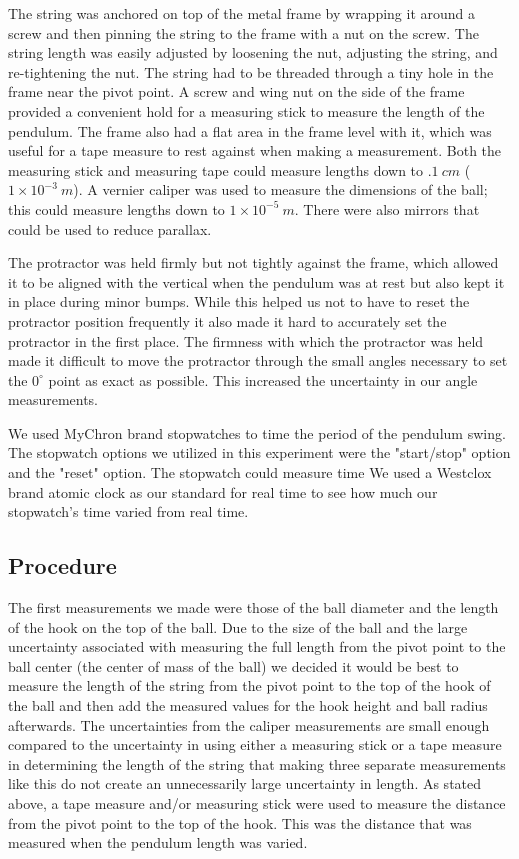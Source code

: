 \documentclass[iop]{emulateapj}
\def\deg{^{\circ}}
\begin{document}
The string was anchored 
on top of the metal frame by wrapping it around a screw and then pinning the 
string to the frame with a nut on the screw.  The string length was easily 
adjusted by loosening the nut, adjusting the string, and re-tightening the 
nut.  The string had to be threaded through a tiny hole in the frame near 
the pivot point. 
A screw and wing nut on the side of the frame provided a convenient hold 
for a measuring stick to measure the length of the pendulum.  The frame also 
had a flat area in the frame level with it, which was useful for a tape 
measure to rest against when making a measurement.  Both the measuring stick 
and measuring tape could measure lengths down to $.1~cm$ 
($1\times 10^{-3}~m$).  A vernier caliper was used to measure the dimensions 
of the ball; this could measure lengths down to $1\times 10^{-5}~m$. There 
were also mirrors that could be used to reduce parallax.



The protractor was held firmly but not tightly against the frame, which 
allowed it to be aligned with the vertical when the pendulum was at rest 
but also 
kept it in place during minor bumps.  While this helped us not to have to 
reset the protractor position frequently it also made it hard to accurately 
set the protractor in the first place. The firmness with which the protractor 
was held made it difficult to move the protractor through the small angles 
necessary to set the $0\deg$ point as exact as possible.  This increased the 
uncertainty in our angle measurements.

We used MyChron brand stopwatches to time the period of the pendulum 
swing.  The stopwatch options we utilized in this experiment were the 
"start/stop" option and the "reset" option. The stopwatch could measure time 
We used a Westclox brand atomic clock as our standard for real time 
to see how much our stopwatch's time varied from real time.

\subsection{Procedure}

The first measurements we made were those of the ball diameter and the length 
of the hook on the top of the ball.  Due to the size of 
the ball and the large uncertainty associated with measuring the full length 
from the pivot point to the ball center (the center of mass of the
ball) we decided it would be best to measure the length of the string from the
pivot point to the top of the hook of the ball and then add the measured values 
for the hook height and ball radius afterwards.  The uncertainties from the 
caliper measurements are small enough compared to the uncertainty in using 
either a measuring stick or a tape measure in determining the length of the
string that making three separate measurements like this do not create an 
unnecessarily large uncertainty in length.  As stated above, a tape measure 
and/or measuring stick were used to measure the distance from the pivot point
to the top of the hook.  This was the distance that was measured when the
pendulum length was varied.
\end{document}
